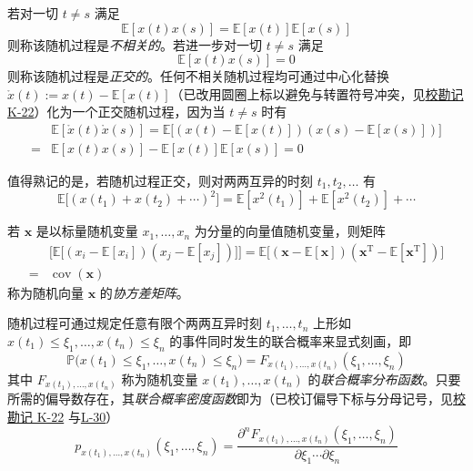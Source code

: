 若对一切 $t \neq s$ 满足
\begin{equation*}
\mathbb{E}[x(t)x(s)] = \mathbb{E}[x(t)]\mathbb{E}[x(s)]
\end{equation*}
则称该随机过程是\emph{不相关的}。若进一步对一切 $t \neq s$ 满足
\begin{equation*}
\mathbb{E}[x(t)x(s)] = 0
\end{equation*}
则称该随机过程是\emph{正交的}。任何不相关随机过程均可通过中心化替换 $\mathring{x}(t) := x(t) - \mathbb{E}[x(t)]$（已改用圆圈上标以避免与转置符号冲突，见\hyperref[sec:k22]{校勘记 K-22}）化为一个正交随机过程，因为当 $t \neq s$ 时有
\begin{equation*}
\begin{aligned}
&\mathbb{E}[\mathring{x}(t)\mathring{x}(s)] = \mathbb{E}\bigl[(x(t) - \mathbb{E}[x(t)])(x(s) - \mathbb{E}[x(s)])\bigr] \\
= &\mathbb{E}[x(t)x(s)] - \mathbb{E}[x(t)]\mathbb{E}[x(s)] = 0
\end{aligned}
\end{equation*}

值得熟记的是，若随机过程正交，则对两两互异的时刻 $t_1, t_2, \dots$ 有
\begin{equation*}
\mathbb{E}\bigl[(x(t_1) + x(t_2) + \cdots)^2\bigr] = \mathbb{E}[x^2(t_1)] + \mathbb{E}[x^2(t_2)] + \cdots
\end{equation*}

若 $\bm{x}$ 是以标量随机变量 $x_1, \dots, x_n$ 为分量的向量值随机变量，则矩阵
\begin{equation}\label{eq:42}
\begin{aligned}
&\bigl[\mathbb{E}\bigl[(x_i - \mathbb{E}[x_i])(x_j - \mathbb{E}[x_j])\bigr]\bigr] = \mathbb{E}\bigl[(\bm{x} - \mathbb{E}[\bm{x}])(\bm{x}^{\mathrm{T}} - \mathbb{E}[\bm{x}^{\mathrm{T}}])\bigr] \\
= &\operatorname{cov}(\bm{x})
\end{aligned}
\end{equation}
称为随机向量 $\bm{x}$ 的\emph{协方差矩阵}。

随机过程可通过规定任意有限个两两互异时刻 $t_1, \dots, t_n$ 上形如 $x(t_1) \leq \xi_1, \dots, x(t_n) \leq \xi_n$ 的事件同时发生的联合概率来显式刻画，即
\begin{equation}\label{eq:43}
\mathbb{P}\bigl(x(t_1) \leq \xi_1, \dots, x(t_n) \leq \xi_n\bigr) = F_{x(t_1),\dots,x(t_n)}(\xi_1, \dots, \xi_n)
\end{equation}
其中 $F_{x(t_1),\dots,x(t_n)}$ 称为随机变量 $x(t_1), \dots, x(t_n)$ 的\emph{联合概率分布函数}。只要所需的偏导数存在，其\emph{联合概率密度函数}即为（已校订偏导下标与分母记号，见\hyperref[sec:k22]{校勘记 K-22} 与\hyperref[sec:l-all]{L-30}）
\begin{equation*}
p_{x(t_1),\dots,x(t_n)}(\xi_1, \dots, \xi_n) = \frac{\partial^n F_{x(t_1),\dots,x(t_n)}(\xi_1, \dots, \xi_n)}{\partial\xi_1 \cdots \partial\xi_n}
\end{equation*}

